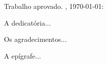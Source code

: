 \imprimircapa
\imprimirfolhaderosto


\begin{folhadeaprovacao}
    \begin{center}
        {\ABNTEXchapterfont\large\imprimirautor}
        \vspace*{\fill}\vspace*{\fill}
        \begin{center}
            \ABNTEXchapterfont\bfseries\Large\imprimirtitulo
        \end{center}
        \vspace*{\fill}
    \hspace{.45\textwidth}
    \begin{minipage}{.5\textwidth}
        \imprimirpreambulo
    \end{minipage}%
    \vspace*{\fill}
    \end{center}

    Trabalho aprovado. \imprimirlocal, \today:

    \begin{center}
        \vspace*{0.5cm}
        {\large\imprimirlocal}
        \par
        {\large\imprimirdata}
        \vspace*{1cm}
    \end{center}
\end{folhadeaprovacao}

\begin{dedicatoria}
	\vspace*{\fill}
	A dedicatória...
	\vspace*{\fill}
\end{dedicatoria}

\begin{agradecimentos}
   Os agradecimentos...
\end{agradecimentos}

\begin{epigrafe}
	\vspace*{\fill}
	\begin{flushright}
		A epígrafe...
	\end{flushright}
\end{epigrafe}

